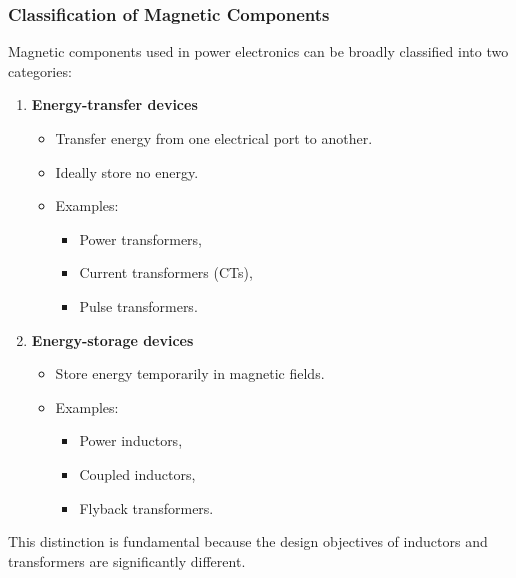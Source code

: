 \begin{frame}
\frametitle{Classification of Magnetic Components}
Magnetic components used in power electronics can be broadly classified into two categories:

\vspace{0.2cm}

\begin{enumerate}
\item \textbf{Energy-transfer devices}
\begin{itemize}
\item Transfer energy from one electrical port to another.
\item Ideally store no energy.
\item Examples:
\begin{itemize}
\item Power transformers,
\item Current transformers (CTs),
\item Pulse transformers.
\end{itemize}
\end{itemize}

\item \textbf{Energy-storage devices}
\begin{itemize}
\item Store energy temporarily in magnetic fields.
\item Examples:
\begin{itemize}
\item Power inductors,
\item Coupled inductors,
\item Flyback transformers.
\end{itemize}
\end{itemize}

\end{enumerate}

\vspace{0.15cm}

This distinction is fundamental because the design objectives of inductors and transformers are significantly different.

\end{frame}


